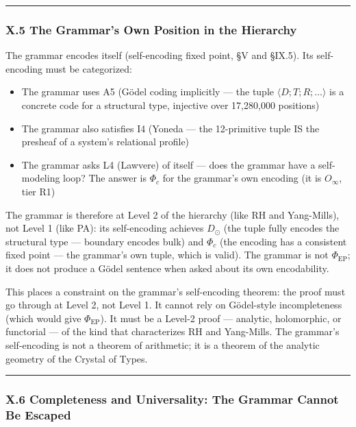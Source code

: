 \documentclass[12pt,a4paper]{article}
\newcommand{\pilcrow}{\S}
\begin{document}
\begin{center}
\rule{0.5\textwidth}{0.4pt}
\end{center}

\subsubsection{X.5 The Grammar's Own Position in the Hierarchy}

The grammar encodes itself (self-encoding fixed point, \pilcrow{}V and \pilcrow{}IX.5). Its self-encoding must be categorized:

\begin{itemize}
    \item The grammar uses A5 (G\"odel coding implicitly --- the tuple $\langle D; T; R; \ldots \rangle$ is a concrete code for a structural type, injective over 17,280,000 positions)
    \item The grammar also satisfies I4 (Yoneda --- the 12-primitive tuple IS the presheaf of a system's relational profile)
    \item The grammar asks L4 (Lawvere) of itself --- does the grammar have a self-modeling loop? The answer is $\Phi_c$ for the grammar's own encoding (it is $O_{\infty}$, tier R1)
\end{itemize}

The grammar is therefore at Level 2 of the hierarchy (like RH and Yang-Mills), not Level 1 (like PA): its self-encoding achieves $D_{\odot}$ (the tuple fully encodes the structural type --- boundary encodes bulk) and $\Phi_c$ (the encoding has a consistent fixed point --- the grammar's own tuple, which is valid). The grammar is not $\Phi_\text{EP}$; it does not produce a G\"odel sentence when asked about its own encodability.

This places a constraint on the grammar's self-encoding theorem: the proof must go through at Level 2, not Level 1. It cannot rely on G\"odel-style incompleteness (which would give $\Phi_\text{EP}$). It must be a Level-2 proof --- analytic, holomorphic, or functorial --- of the kind that characterizes RH and Yang-Mills. The grammar's self-encoding is not a theorem of arithmetic; it is a theorem of the analytic geometry of the Crystal of Types.\begin{center}
\rule{0.5\textwidth}{0.4pt}
\end{center}

\subsubsection{X.6 Completeness and Universality: The Grammar Cannot Be Escaped}
\end{document}
